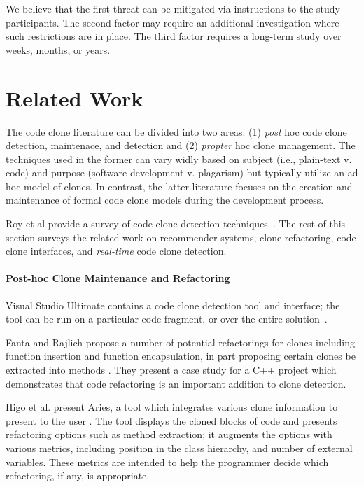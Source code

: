 \documentclass[preprint,10pt]{sigplanconf}
\begin{document}
We believe that the first threat can be mitigated via instructions to
the study participants. The second factor may require an additional
investigation where such restrictions are in place.  The third factor
requires a long-term study over weeks, months, or years.

\section{Related Work}
\label{sec:related}

The code clone literature can be divided into two areas: (1)
\emph{post} hoc code clone detection, maintenace, and detection and
(2) \emph{propter} hoc clone management. The techniques used in the
former can vary widly based on subject (i.e., plain-text v. code) and
purpose (software development v. plagarism) but typically utilize an
ad hoc model of clones. In contrast, the latter literature focuses on
the creation and maintenance of formal code clone models during the
development process.

Roy et al provide a survey of code clone detection
techniques~\cite{Roy2009}. The rest of this section surveys the
related work on recommender systems, clone refactoring,
 code clone interfaces, and \emph{real-time} code clone detection.

\paragraph{Post-hoc Clone Maintenance and Refactoring}

Visual Studio Ultimate contains a code clone detection tool and
interface; the tool can be run on a particular code fragment, or over
the entire solution~\cite{VSClones}. 


Fanta and Rajlich propose a number of
potential refactorings for clones including function insertion and function encapsulation,
in part proposing certain clones be extracted into methods \cite{Fanta1999}.  They 
present a case study for a C++ project which demonstrates that code refactoring is an important 
addition to clone detection.

Higo et al. present Aries, a tool which integrates various clone
information to present to the user \cite{Higo2008}.  The tool displays the
cloned blocks of code and presents refactoring options such as method
extraction; it augments the options with various metrics, including position in
the class hierarchy, and number of external variables. These metrics
are intended to help the programmer decide which refactoring, if any,
is appropriate.
\end{document}
